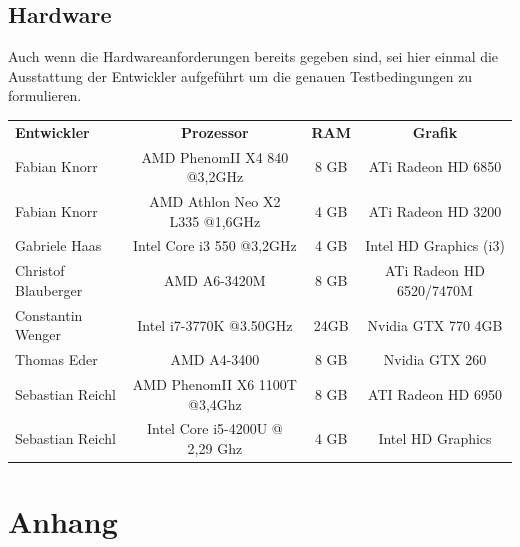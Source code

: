\documentclass[10pt]{scrreprt}
\begin{document}
\section{Hardware}
Auch wenn die Hardwareanforderungen bereits gegeben sind, sei hier einmal die Ausstattung der Entwickler aufgeführt um die genauen Testbedingungen zu formulieren.

\vspace{0.5cm}

\begin{tabular}{l|c|c|c}
\textsf{\textbf{Entwickler}} & \textsf{\textbf{Prozessor}} & \textsf{\textbf{RAM}} & \textsf{\textbf{Grafik}} \\
Fabian Knorr & AMD PhenomII X4 840 @3,2GHz & 8 GB & ATi Radeon HD 6850 \\
Fabian Knorr & AMD Athlon Neo X2 L335 @1,6GHz & 4 GB & ATi Radeon HD 3200 \\
Gabriele Haas & Intel Core i3 550 @3,2GHz & 4 GB & Intel HD Graphics (i3) \\
Christof Blauberger & AMD A6-3420M & 8 GB & ATi Radeon HD 6520/7470M \\
Constantin Wenger & Intel i7-3770K @3.50GHz & 24GB & Nvidia GTX 770 4GB \\
Thomas Eder & AMD A4-3400 & 8 GB & Nvidia GTX 260 \\
Sebastian Reichl & AMD PhenomII X6 1100T @3,4Ghz & 8 GB & ATI Radeon HD 6950 \\
Sebastian Reichl & Intel Core i5-4200U @ 2,29 Ghz & 4 GB & Intel HD Graphics \\
\end{tabular}

\vspace{0.5cm}



\chapter{Anhang}
\end{document}
